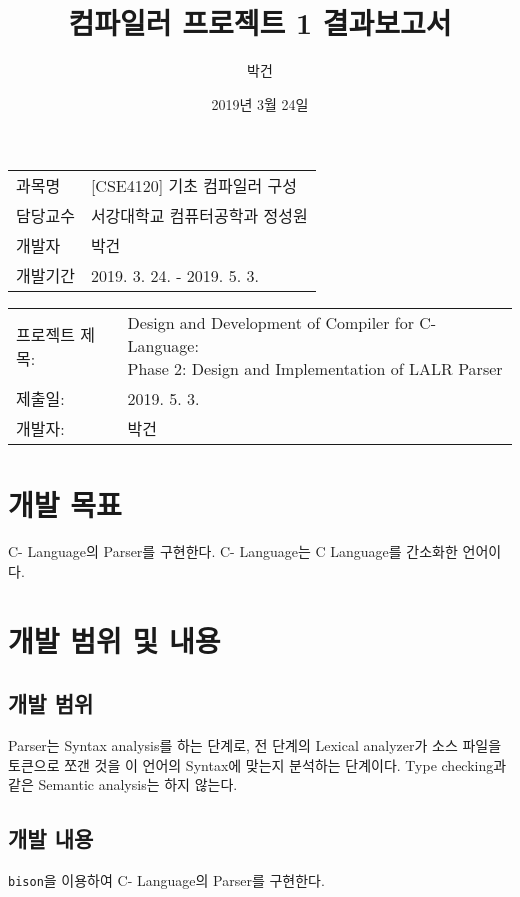 \documentclass[a4paper, 10pt]{oblivoir}
\title{컴파일러 프로젝트 1 결과보고서}
\author{박건}
\date{2019년 3월 24일}
\begin{document}
\maketitle

\vspace*{\fill}

\begin{center}
\begin{tabular}{ l l }
과목명 & [CSE4120] 기초 컴파일러 구성 \\
담당교수 & 서강대학교 컴퓨터공학과 정성원 \\
개발자 & 박건 \\
개발기간 & 2019. 3. 24. - 2019. 5. 3. \\
\end{tabular}
\end{center}

\vspace*{\fill}

\pagebreak

\begin{tabular}{ l l }
프로젝트 제목: & \makecell{Design and Development of Compiler for C- Language: \\
Phase 2: Design and Implementation of LALR Parser} \\
제출일: & 2019. 5. 3.\\
개발자: & 박건 \\
\end{tabular}

\section{개발 목표}
C- Language의 Parser를 구현한다. C- Language는 C Language를 간소화한 언어이다.

\section{개발 범위 및 내용}
\subsection{개발 범위}
Parser는 Syntax analysis를 하는 단계로, 전 단계의 Lexical analyzer가 소스 파일을 토큰으로 쪼갠 것을 이 언어의 Syntax에 맞는지 분석하는 단계이다. Type checking과 같은 Semantic analysis는 하지 않는다.

\subsection{개발 내용}
\texttt{bison}을 이용하여 C- Language의 Parser를 구현한다.
\end{document}

